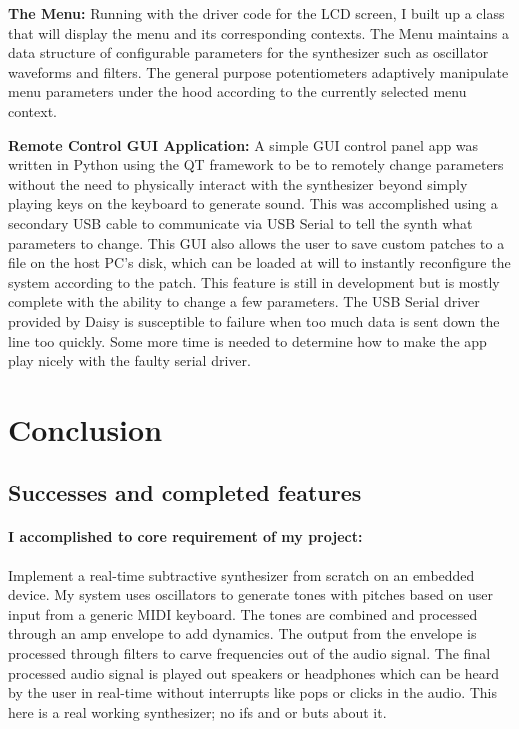 \documentclass[acmlarge,screen]{acmart}
\begin{document}
	\textbf{The Menu:} Running with the driver code for the LCD screen, I built up a class that will display the menu and its corresponding contexts. The Menu maintains a data structure of configurable parameters for the synthesizer such as oscillator waveforms and filters. The general purpose potentiometers adaptively manipulate menu parameters under the hood according to the currently selected menu context.
	
	\textbf{Remote Control GUI Application:} A simple GUI control panel app was written in Python using the QT framework to be to remotely change parameters without the need to physically interact with the synthesizer beyond simply playing keys on the keyboard to generate sound. This was accomplished using a secondary USB cable to communicate via USB Serial to tell the synth what parameters to change. This GUI also allows the user to save custom patches to a file on the host PC's disk, which can be loaded at will to instantly reconfigure the system according to the patch. This feature is still in development but is mostly complete with the ability to change a few parameters. The USB Serial driver provided by Daisy is susceptible to failure when too much data is sent down the line too quickly. Some more time is needed to determine how to make the app play nicely with the faulty serial driver.

\section{Conclusion}
	\subsection{Successes and completed features} 
	\paragraph{I accomplished to core requirement of my project:} Implement a real-time subtractive synthesizer from scratch on an embedded device. My system uses oscillators to generate tones with pitches based on user input from a generic MIDI keyboard. The tones are combined and processed through an amp envelope to add dynamics. The output from the envelope is processed through filters to carve frequencies out of the audio signal. The final processed audio signal is played out speakers or headphones which can be heard by the user in real-time without interrupts like pops or clicks in the audio. This here is a real working synthesizer; no ifs and or buts about it.
	
\end{document}
